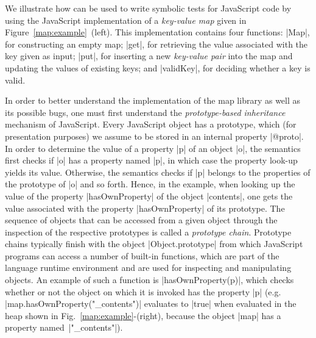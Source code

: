 
We illustrate how \jilette can be used to write symbolic tests for JavaScript code by using the JavaScript implementation 
of a  \emph{key-value map} given in Figure~\ref{map:example}~(left). 
This implementation contains four functions: 
\jsinline|Map|, for constructing an empty map;
\jsinline|get|, for retrieving the value associated with the key given as input;
\jsinline|put|, for inserting a new \emph{key-value pair} into the map and updating the values of existing keys; and
\jsinline|validKey|, for deciding whether a key is valid.

In order to better understand the implementation of the map library as well as its possible bugs, 
one must first understand the \emph{prototype-based inheritance} mechanism of JavaScript. 
Every JavaScript object has a prototype, which (for presentation purposes) we assume to 
be stored  in an internal property \jsinline|@proto|. In order to determine the value of a property
\jsinline|p| of an object \jsinline|o|, the semantics first checks if \jsinline|o| has a 
property named \jsinline|p|, in which case the property look-up yields its value. Otherwise, the 
semantics checks if \jsinline|p| belongs to the properties of the prototype of \jsinline|o| and so 
forth. Hence, in the example, when looking up the value of the property \jsinline|hasOwnProperty|
of the object \jsinline|contents|, one gets the value associated with the property  \jsinline|hasOwnProperty|
of its prototype.
The sequence of objects that can be accessed from a given object through the inspection 
of the respective prototypes is called a \emph{prototype chain}.
Prototype chains typically finish with the object \jsinline|Object.prototype| from which JavaScript 
programs can access a number of built-in functions, which are part of the language runtime environment and are used for inspecting and manipulating objects.
An example of such a function is \jsinline|hasOwnProperty(p)|, which checks whether or not the object 
on which it is invoked has the property \jsinline|p| (e.g. {\small \jsinline|map.hasOwnProperty("_contents")|}
evaluates to \jsinline|true| when evaluated in the heap shown in Fig.~\ref{map:example}-(right), 
because the object \jsinline|map| has a property named~\jsinline|"_contents"|). 


